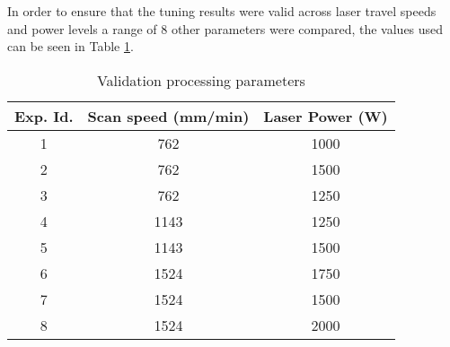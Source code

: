 \label{validation}

In order to ensure that the tuning results were valid across laser travel speeds and power levels a range of 8 other parameters were compared, the values used can be seen in Table \ref{tab:val_parameters}.
\begin{table}[!htb]
	\centering
	\caption{Validation processing parameters}
	\label{tab:val_parameters}
		\begin{tabular}{|c|c|c|} \hline 
			Exp. Id. & Scan speed (mm/min) & Laser Power (W) \\ \hline
			1 & 762 & 1000 \\ \hline  %
			2 & 762 & 1500 \\ \hline  %
			3 & 762 & 1250 \\ \hline  %
			4 & 1143 & 1250 \\ \hline %
			5 & 1143 & 1500 \\ \hline  %
			6 & 1524 & 1750 \\ \hline  %
			7 & 1524 & 1500 \\ \hline  %
			8 & 1524 & 2000 \\ \hline  %
		\end{tabular}
\end{table}

